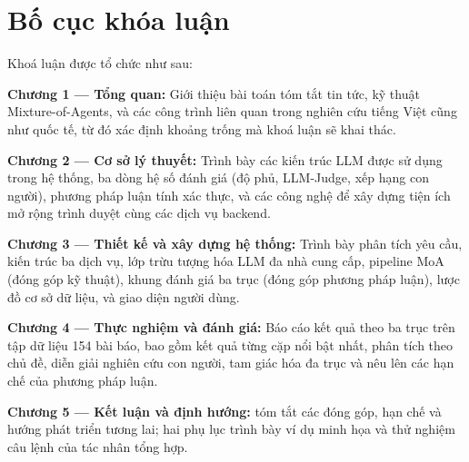 \section*{Bố cục khóa luận}

Khoá luận được tổ chức như sau:

\textbf{Chương 1 --- Tổng quan:} Giới thiệu bài toán tóm tắt tin tức,
kỹ thuật Mixture-of-Agents, và các công trình liên quan trong nghiên cứu tiếng Việt
cũng như quốc tế, từ đó xác định khoảng trống mà khoá luận sẽ khai thác.

\textbf{Chương 2 --- Cơ sở lý thuyết:} Trình bày các kiến trúc LLM được sử dụng
trong hệ thống, ba dòng hệ số đánh giá (độ phủ, LLM-Judge, xếp hạng con người),
phương pháp luận tính xác thực, và các công nghệ để xây dựng tiện ích mở rộng trình
duyệt cùng các dịch vụ backend.

\textbf{Chương 3 --- Thiết kế và xây dựng hệ thống:} Trình bày phân tích yêu cầu,
kiến trúc ba dịch vụ, lớp trừu tượng hóa LLM đa nhà cung cấp, pipeline MoA (đóng
góp kỹ thuật), khung đánh giá ba trục (đóng góp phương pháp luận), lược đồ cơ sở
dữ liệu, và giao diện người dùng.

\textbf{Chương 4 --- Thực nghiệm và đánh giá:} Báo cáo kết quả theo ba trục trên
tập dữ liệu 154 bài báo, bao gồm kết quả từng cặp nổi bật nhất, phân tích theo chủ đề, diễn giải nghiên cứu
con người, tam giác hóa đa trục và nêu lên các hạn chế của phương pháp luận.

\textbf{Chương 5 --- Kết luận và định hướng:} tóm tắt các đóng góp, hạn chế và hướng phát triển tương lai;
hai phụ lục trình bày ví dụ minh họa và thử nghiệm câu lệnh của tác nhân tổng hợp.
